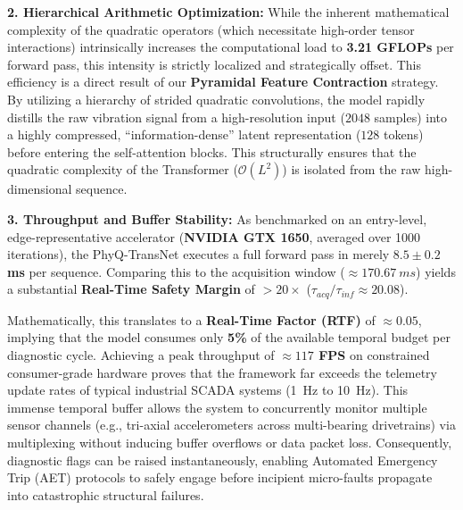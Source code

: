 \documentclass[5p,times,twocolumn]{elsarticle}
\begin{document}
\textbf{2. Hierarchical Arithmetic Optimization:} 
While the inherent mathematical complexity of the quadratic operators (which necessitate high-order tensor interactions) intrinsically increases the computational load to \textbf{3.21 GFLOPs} per forward pass, this intensity is strictly localized and strategically offset. This efficiency is a direct result of our \textbf{Pyramidal Feature Contraction} strategy. By utilizing a hierarchy of strided quadratic convolutions, the model rapidly distills the raw vibration signal from a high-resolution input ($2048$ samples) into a highly compressed, ``information-dense'' latent representation ($128$ tokens) before entering the self-attention blocks. This structurally ensures that the quadratic complexity of the Transformer ($\mathcal{O}(L^2)$) is isolated from the raw high-dimensional sequence.

\textbf{3. Throughput and Buffer Stability:} 
As benchmarked on an entry-level, edge-representative accelerator (\textbf{NVIDIA GTX 1650}, averaged over 1000 iterations), the PhyQ-TransNet executes a full forward pass in merely \textbf{$8.5 \pm 0.2$ ms} per sequence. Comparing this to the acquisition window ($\approx \SI{170.67}{ms}$) yields a substantial \textbf{Real-Time Safety Margin} of $>20\times$ ($\tau_{acq} / \tau_{inf} \approx 20.08$). 

Mathematically, this translates to a \textbf{Real-Time Factor (RTF)} of $\approx 0.05$, implying that the model consumes only \textbf{5\%} of the available temporal budget per diagnostic cycle. Achieving a peak throughput of \textbf{$\approx 117$ FPS} on constrained consumer-grade hardware proves that the framework far exceeds the telemetry update rates of typical industrial SCADA systems (\SI{1}{Hz} to \SI{10}{Hz}). This immense temporal buffer allows the system to concurrently monitor multiple sensor channels (e.g., tri-axial accelerometers across multi-bearing drivetrains) via multiplexing without inducing buffer overflows or data packet loss. Consequently, diagnostic flags can be raised instantaneously, enabling Automated Emergency Trip (AET) protocols to safely engage before incipient micro-faults propagate into catastrophic structural failures.
\end{document}

